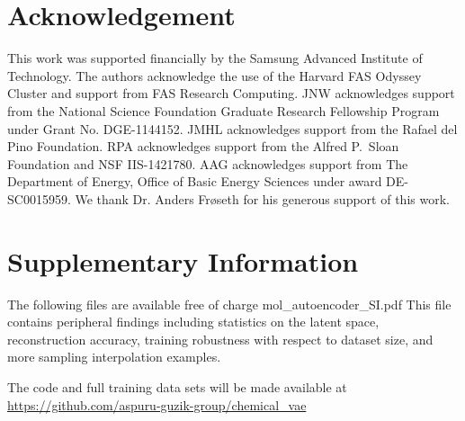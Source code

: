 \section{Acknowledgement}

This work was supported financially by the Samsung Advanced Institute of Technology.
The authors acknowledge the use of the Harvard FAS Odyssey Cluster and support from FAS Research Computing.
JNW acknowledges support from the National Science Foundation Graduate Research Fellowship Program under Grant No. DGE-1144152.
JMHL acknowledges support from the Rafael del Pino Foundation. RPA acknowledges support from the Alfred P.\ Sloan Foundation and NSF IIS-1421780. AAG acknowledges support from The Department of Energy, Office of Basic Energy Sciences under award DE-SC0015959.
We thank Dr. Anders Fr\o seth for his generous support of this work.


\section{Supplementary Information}
The following files are available free of charge  mol\_autoencoder\_SI.pdf
This file contains peripheral findings including statistics on the latent space, reconstruction accuracy, training robustness with respect to dataset size, and more sampling interpolation examples.
 
The code and full training data sets will be made available at \url{https://github.com/aspuru-guzik-group/chemical_vae}
